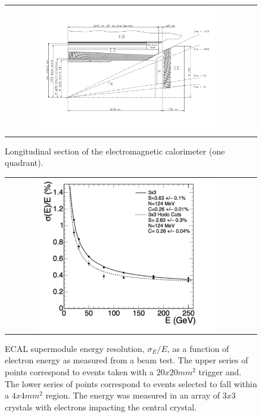 \begin{figure}[tbh!]
	\centering
	\begin{tabular}{cc}
		\includegraphics[width=0.75\textwidth]{detector/pics/ECAL_section.pdf}
	\end{tabular}
	\caption{Longitudinal section of the electromagnetic calorimeter (one quadrant).}
	\label{fig:ECAL_section}
\end{figure}

\begin{figure}[tbh!]
	\centering
	\begin{tabular}{cc}
		\includegraphics[width=0.75\textwidth]{detector/pics/ECAL_resolution.pdf}
	\end{tabular}
	\caption{ECAL supermodule energy resolution, $\sigma_{E}/E$, as a function of electron energy as measured from a beam test. The upper series of points correspond to events taken with a $20x20 mm^{2}$ trigger and. The lower series of points correspond to events selected to fall within a $4x4 mm^{2}$ region. The energy was measured in an array of $3x3$ crystals with electrons impacting the central crystal.}
	\label{fig:ECAL_resolution}
\end{figure}

